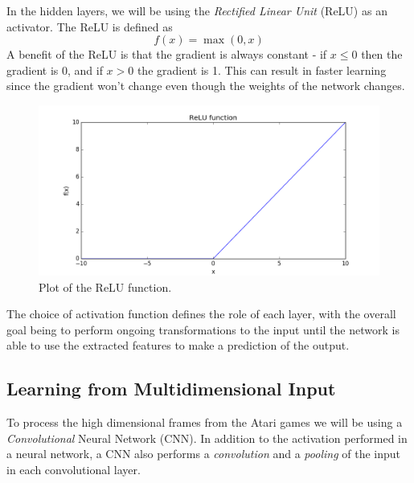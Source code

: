 \documentclass[11pt]{article}
\begin{document}
In the hidden layers, we will be using the \textit{Rectified
Linear Unit} (ReLU) as an activator.
The ReLU is defined as
\begin{equation}
    f(x) = \max(0,x)
\end{equation}
A benefit of the ReLU is that the gradient is always constant - 
if $x \leq 0$ then the gradient is 0, and if $x > 0$ the gradient is 1.
This can result in faster learning since the gradient won't change even
though the weights of the network changes.
\begin{figure}[!h]
    \centering
    \includegraphics[width=15cm]{include/relu.png}
    \caption{Plot of the ReLU function.}
    \label{fig:relu}
\end{figure}

The choice of activation function defines the role of each layer,
with the overall goal being to perform ongoing transformations
to the input until the network is able to use the extracted
features to make a prediction of the output.

\subsection{Learning from Multidimensional Input}

To process the high dimensional frames from the Atari games we will be using
a \textit{Convolutional} Neural Network (CNN).
In addition to the activation performed in a neural network, a CNN
also performs a \textit{convolution} and a \textit{pooling} of the input in each convolutional layer.
\end{document}

